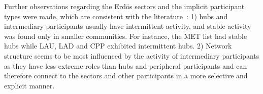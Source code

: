 \documentclass[%
aip,
jmp,%
amsmath,amssymb,
reprint,%
]{revtex4-1}
\begin{document}
Further observations regarding the Erd\"os sectors
and the implicit participant types were made, which are consistent with the literature~\cite{barabasiEvo}: 1) hubs and intermediary participants usually have intermittent activity, and stable activity was found only in smaller communities. For instance, the MET list had stable hubs while LAU, LAD and CPP exhibited intermittent hubs.
2) Network structure seems to be most influenced by the
activity of intermediary participants as they have less extreme
roles than hubs and peripheral participants and
can therefore connect to the sectors and other participants 
in a more selective and explicit manner.







%
%
%
\end{document}
